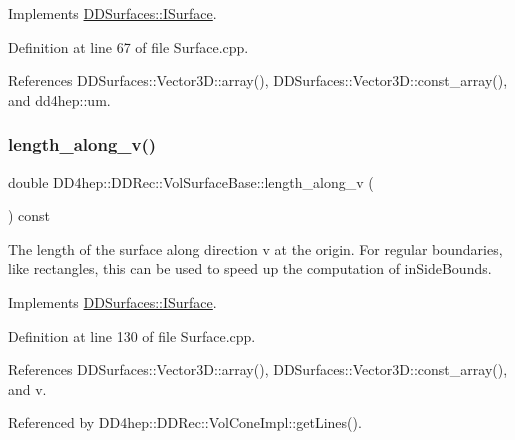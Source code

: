 Implements \hyperlink{class_d_d_surfaces_1_1_i_surface_a0060710912d3447e296a8e0875690cc9}{D\+D\+Surfaces\+::\+I\+Surface}.



Definition at line 67 of file Surface.\+cpp.



References D\+D\+Surfaces\+::\+Vector3\+D\+::array(), D\+D\+Surfaces\+::\+Vector3\+D\+::const\+\_\+array(), and dd4hep\+::um.

\hypertarget{class_d_d4hep_1_1_d_d_rec_1_1_vol_surface_base_a638bb48002c1108d801c39949ac7d675}{}\label{class_d_d4hep_1_1_d_d_rec_1_1_vol_surface_base_a638bb48002c1108d801c39949ac7d675} 
\subsubsection{\texorpdfstring{length\+\_\+along\+\_\+v()}{length\_along\_v()}}
{\footnotesize\ttfamily double D\+D4hep\+::\+D\+D\+Rec\+::\+Vol\+Surface\+Base\+::length\+\_\+along\+\_\+v (\begin{DoxyParamCaption}{ }\end{DoxyParamCaption}) const\hspace{0.3cm}{\ttfamily [virtual]}}

The length of the surface along direction v at the origin. For \textquotesingle{}regular\textquotesingle{} boundaries, like rectangles, this can be used to speed up the computation of in\+Side\+Bounds. 

Implements \hyperlink{class_d_d_surfaces_1_1_i_surface_a9a4682bfa68557d53cfd319cfa54148d}{D\+D\+Surfaces\+::\+I\+Surface}.



Definition at line 130 of file Surface.\+cpp.



References D\+D\+Surfaces\+::\+Vector3\+D\+::array(), D\+D\+Surfaces\+::\+Vector3\+D\+::const\+\_\+array(), and v.



Referenced by D\+D4hep\+::\+D\+D\+Rec\+::\+Vol\+Cone\+Impl\+::get\+Lines().

\hypertarget{class_d_d4hep_1_1_d_d_rec_1_1_vol_surface_base_a9cf248895aeb84a7e2cd2b2068661397}{}\label{class_d_d4hep_1_1_d_d_rec_1_1_vol_surface_base_a9cf248895aeb84a7e2cd2b2068661397} 
